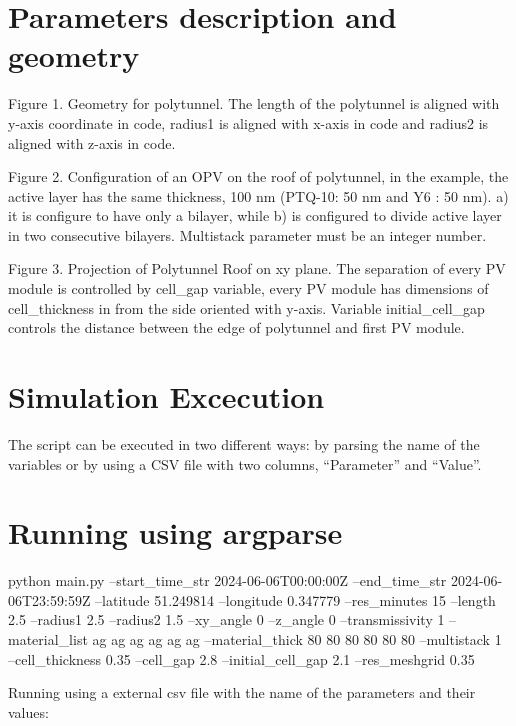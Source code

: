 \documentclass{report}
\begin{document}
\section{Parameters description and geometry}



Figure 1. Geometry for polytunnel. The length of the polytunnel is aligned with y-axis coordinate in code, radius1 is aligned with x-axis in code and radius2 is aligned with z-axis in code.


Figure 2. Configuration of an OPV on the roof of polytunnel, in the example, the active layer has the same thickness, 100 nm (PTQ-10: 50 nm and Y6 : 50 nm). a) it is configure to have only a bilayer, while b) is configured to divide active layer in two consecutive bilayers. Multistack parameter must be an integer number.


 













Figure 3. Projection of Polytunnel Roof on xy plane. The separation of every PV module is controlled by cell_gap variable, every PV module has dimensions of cell_thickness in from the side oriented with y-axis. Variable initial_cell_gap controls the distance between the edge of polytunnel and first PV module. 
\section{Simulation Excecution}

The script can be executed in two different ways: by parsing the name of the variables or by using a CSV file with two columns, “Parameter” and “Value”. 

\section{Running using argparse}

python main.py --start_time_str 2024-06-06T00:00:00Z --end_time_str 2024-06-06T23:59:59Z --latitude 51.249814 --longitude 0.347779 --res_minutes 15 --length 2.5 --radius1 2.5 --radius2 1.5 --xy_angle 0 --z_angle 0 --transmissivity 1 --material_list ag ag ag ag ag ag --material_thick 80 80 80 80 80 80 --multistack 1 --cell_thickness 0.35 --cell_gap 2.8 --initial_cell_gap 2.1 --res_meshgrid 0.35 

Running using a external csv file with the name of the parameters and their values:
\end{document}
